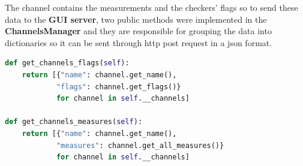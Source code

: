 The channel contains the measurements and the checkers' flags so to send these data
to the \textbf{GUI server}, two public methods were implemented in the \textbf{ChannelsManager}
and they are responsible for grouping the data into dictionaries so it can be sent through http 
post request in a json format.
\newline
\begin{lstlisting}[language=python, caption={data grouping methods},captionpos=b]
def get_channels_flags(self):
	return [{"name": channel.get_name(),
			"flags": channel.get_flags()}
			for channel in self.__channels]
	
def get_channels_measures(self):
	return [{"name": channel.get_name(),
			"measures": channel.get_all_measures()}
			for channel in self.__channels]
\end{lstlisting}
